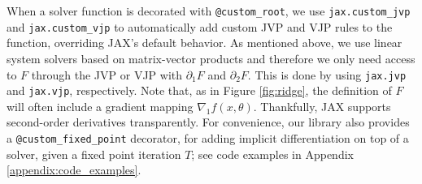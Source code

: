 \documentclass{article}
\begin{document}
%
%

When a solver function is decorated with \texttt{@custom\_root}, we use
\texttt{jax.custom\_jvp} and \texttt{jax.custom\_vjp} to automatically add
custom JVP and VJP rules to the function, overriding JAX's default behavior.
As mentioned above, we use linear system solvers based on matrix-vector products
and therefore we only need access to $F$ through the JVP or VJP
with $\partial_1 F$ and $\partial_2 F$. This is done by using \texttt{jax.jvp} and
\texttt{jax.vjp}, respectively. Note that, as in Figure \ref{fig:ridge}, the
definition of $F$ will often include a gradient mapping $\nabla_1 f(x, \theta)$.
Thankfully, JAX supports second-order derivatives
transparently.  For convenience, our library also provides a
\texttt{@custom\_fixed\_point} decorator, for adding implicit differentiation on
top of a solver, given a fixed point iteration $T$; see code examples in
Appendix \ref{appendix:code_examples}.  
\end{document}
